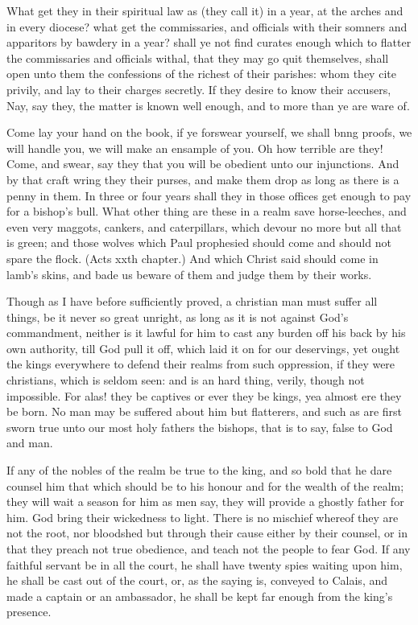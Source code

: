 What get they in their spiritual law as (they call it) in a 
year, at the arches and in every diocese? what get the commissaries,
and officials with their somners and apparitors 
by bawdery in a year? shall ye not find curates enough 
which to flatter the commissaries and officials withal, that 
they may go quit themselves, shall open unto them the 
confessions of the richest of their parishes: whom they 
cite privily, and lay to their charges secretly. If they desire
to know their accusers, Nay, say they, the matter is 
known well enough, and to more than ye are ware of. 

Come lay your hand on the book, if ye forswear yourself,
we shall bnng proofs, we will handle you, we will make
an ensample of you. Oh how terrible are they! Come, and 
swear, say they that you will be obedient unto our injunctions.
And by that craft wring they their purses, and 
make them drop as long as there is a penny in them. In 
three or four years shall they in those offices get enough to 
pay for a bishop's bull. What other thing are these in a 
realm save horse-leeches, and even very maggots, cankers, 
and caterpillars, which devour no more but all that is green; 
and those wolves which Paul prophesied should come and 
should not spare the flock. (Acts xxth chapter.) And 
which Christ said should come in lamb's skins, and bade us 
beware of them and judge them by their works. 

Though as I have before sufficiently proved, a christian
man must suffer all things, be it never so great unright,
as long as it is not against God's commandment, neither is
it lawful for him to cast any burden off his back by his
own authority, till God pull it off, which laid it on for our
deservings, yet ought the kings everywhere to defend their 
realms from such oppression, if they were christians, which 
is seldom seen: and is an hard thing, verily, though not impossible.
For alas! they be captives or ever they be kings, 
yea almost ere they be born. No man may be suffered 
about him but flatterers, and such as are first sworn true 
unto our most holy fathers the bishops, that is to say, false 
to God and man. 

If any of the nobles of the realm be true to the king, 
and so bold that he dare counsel him that which should be 
to his honour and for the wealth of the realm; they will 
wait a season for him as men say, they will provide a 
ghostly father for him. God bring their wickedness to 
light. There is no mischief whereof they are not the root, 
nor bloodshed but through their cause either by their counsel,
or in that they preach not true obedience, and teach 
not the people to fear God. If any faithful servant be in 
all the court, he shall have twenty spies waiting upon him, 
he shall be cast out of the court, or, as the saying is, conveyed
to Calais, and made a captain or an ambassador, he 
shall be kept far enough from the king's presence. 

